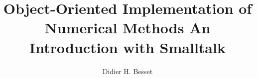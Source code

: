 \documentclass[twoside]{book}
\begin{document}
\title{Object-Oriented Implementation of \linebreak Numerical Methods\linebreak
 An Introduction with Smalltalk}
\author{Didier H. Besset}
\maketitle {}
{\parskip 0pt \tableofcontents \listoffigures \listoftables
} \cleardoublepage{}






\appendix


% 




\end{document}
